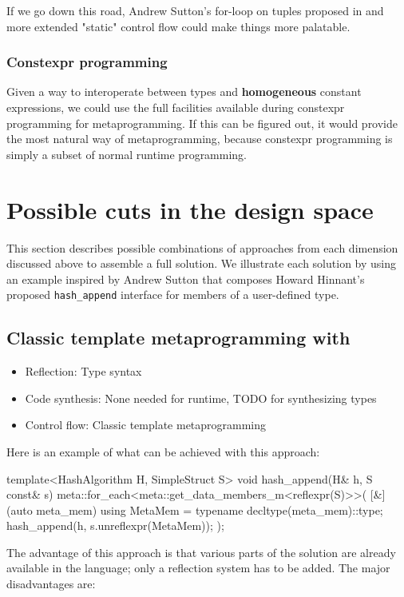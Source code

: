 \documentclass{wg21}
\newcommand{\cc}[1]{\texttt{#1}}
\begin{document}
If we go down this road, Andrew Sutton's for-loop on tuples proposed in
\cite{P0589} and more extended "static" control flow could make things
more palatable.

\subsubsection{Constexpr programming}
Given a way to interoperate between types and \textbf{homogeneous} constant
expressions, we could use the full facilities available during constexpr
programming for metaprogramming. If this can be figured out, it would provide
the most natural way of metaprogramming, because constexpr programming is
simply a subset of normal runtime programming.


\section{Possible cuts in the design space}
This section describes possible combinations of approaches from each dimension
discussed above to assemble a full solution. We illustrate each solution by
using an example inspired by Andrew Sutton that composes Howard Hinnant's
proposed \cc{hash_append} interface for members of a user-defined type.

\subsection{Classic template metaprogramming with \cite{P0194}}
\begin{itemize}
  \item Reflection: Type syntax
  \item Code synthesis: None needed for runtime, TODO for synthesizing types
  \item Control flow: Classic template metaprogramming
\end{itemize}

Here is an example of what can be achieved with this approach:

\begin{cpp}
template<HashAlgorithm H, SimpleStruct S>
void hash_append(H& h, S const& s) {
  meta::for_each<meta::get_data_members_m<reflexpr(S)>>(
    [&](auto meta_mem) {
      using MetaMem = typename decltype(meta_mem)::type;
      hash_append(h, s.unreflexpr(MetaMem));
    }
  );
}
\end{cpp}

The advantage of this approach is that various parts of the solution are
already available in the language; only a reflection system has to be added.
The major disadvantages are:
\end{document}
